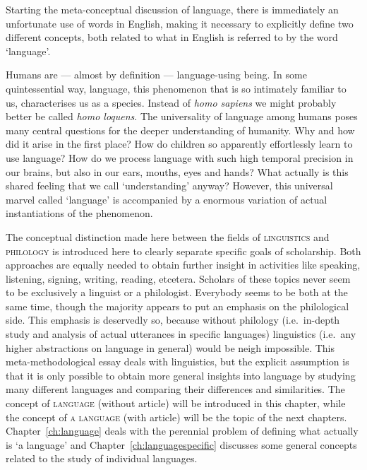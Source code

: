 
Starting the meta-conceptual discussion of language, there is immediately an unfortunate use of words in English, making it necessary to explicitly define two different concepts, both related to what in English is referred to by the word `language'.

%
Humans are --- almost by definition --- language-using being. In some quintessential way, language, this phenomenon that is so intimately familiar to us, characterises us as a species. Instead of \textit{homo sapiens} we might probably better be called \textit{homo loquens}. The universality of language among humans poses many central questions for the deeper understanding of humanity. Why and how did it arise in the first place? How do children so apparently effortlessly learn to use language? How do we process language with such high temporal precision in our brains, but also in our ears, mouths, eyes and hands? What actually is this shared feeling that we call `understanding' anyway? However, this universal marvel called `language' is accompanied by a enormous variation of actual instantiations of the phenomenon.

%
The conceptual distinction made here between the fields of \textsc{linguistics} and \textsc{philology} is introduced here to clearly separate specific goals of scholarship. Both approaches are equally needed to obtain further insight in activities like speaking, listening, signing, writing, reading, etcetera. Scholars of these topics never seem to be exclusively a linguist or a philologist. Everybody seems to be both at the same time, though the majority appears to put an emphasis on the philological side. This emphasis is deservedly so, because without philology (i.e.~in-depth study and analysis of actual utterances in specific languages) linguistics (i.e.~any higher abstractions on language in general) would be neigh impossible. This meta-methodological essay deals with linguistics, but the explicit assumption is that it is only possible to obtain more general insights into language by studying many different languages and comparing their differences and similarities. The concept of \textsc{language} (without article) will be introduced in this chapter, while the concept of \textsc{a language} (with article) will be the  topic of the next chapters. Chapter~\ref{ch:language} deals with the perennial problem of defining what actually is `a language' and Chapter~\ref{ch:languagespecific} discusses some general concepts related to the study of individual languages.

